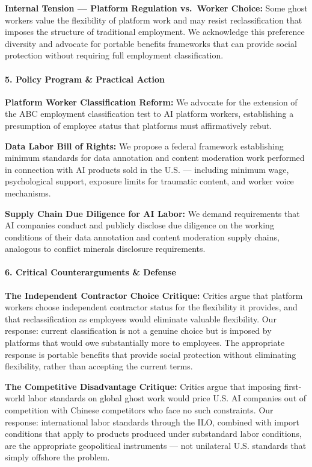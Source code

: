 \textbf{Internal Tension --- Platform Regulation vs.~Worker Choice:}
Some ghost workers value the flexibility of platform work and may resist
reclassification that imposes the structure of traditional employment.
We acknowledge this preference diversity and advocate for portable
benefits frameworks that can provide social protection without requiring
full employment classification.

\paragraph{5. Policy Program \& Practical
Action}\label{policy-program-practical-action-41}

\textbf{Platform Worker Classification Reform:} We advocate for the
extension of the ABC employment classification test to AI platform
workers, establishing a presumption of employee status that platforms
must affirmatively rebut.

\textbf{Data Labor Bill of Rights:} We propose a federal framework
establishing minimum standards for data annotation and content
moderation work performed in connection with AI products sold in the
U.S. --- including minimum wage, psychological support, exposure limits
for traumatic content, and worker voice mechanisms.

\textbf{Supply Chain Due Diligence for AI Labor:} We demand requirements
that AI companies conduct and publicly disclose due diligence on the
working conditions of their data annotation and content moderation
supply chains, analogous to conflict minerals disclosure requirements.

\paragraph{6. Critical Counterarguments \&
Defense}\label{critical-counterarguments-defense-41}

\textbf{The Independent Contractor Choice Critique:} Critics argue that
platform workers choose independent contractor status for the
flexibility it provides, and that reclassification as employees would
eliminate valuable flexibility. Our response: current classification is
not a genuine choice but is imposed by platforms that would owe
substantially more to employees. The appropriate response is portable
benefits that provide social protection without eliminating flexibility,
rather than accepting the current terms.

\textbf{The Competitive Disadvantage Critique:} Critics argue that
imposing first-world labor standards on global ghost work would price
U.S. AI companies out of competition with Chinese competitors who face
no such constraints. Our response: international labor standards through
the ILO, combined with import conditions that apply to products produced
under substandard labor conditions, are the appropriate geopolitical
instruments --- not unilateral U.S. standards that simply offshore the
problem.

